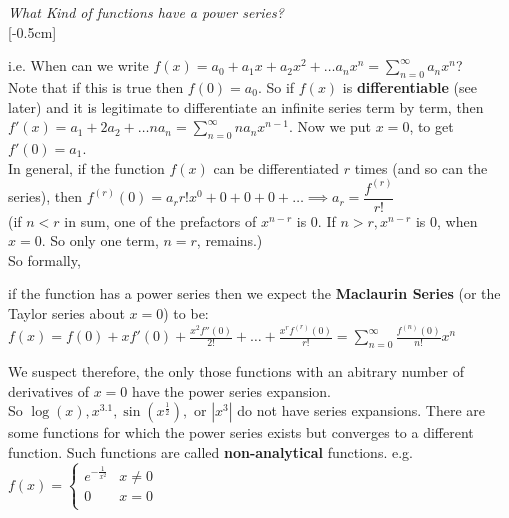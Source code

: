 
\textit{What Kind of functions have a power series?}\\
[-0.5cm]

i.e. When can we write $\displaystyle{f(x) = a_0 + a_1x + a_2x^2 + \dots a_nx^n = \sum_{n=0}^{\infty} a_nx^n}$?\\

Note that if this is true then $f(0) = a_0$. So if $f(x)$ is \textbf{differentiable} (see later)  and it is legitimate to differentiate an infinite series term by term, then $f'(x) = a_1 + 2a_2 + \dots na_n = \sum_{n=0}^{\infty} na_nx^{n-1}$. Now we put $x=0$, to get $f'(0) = a_1$. \\

In general, if the function $f(x)$ can be differentiated $r$ times (and so can the series), then $f^{(r)}(0) = a_r r!x^0 + 0 + 0 + 0 + \dots \implies \boxed{a_r = \dfrac{f^{(r)}}{r!}}$\\

(if $n<r$ in sum, one of the prefactors of $x^{n-r}$ is 0. If $n>r, x^{n-r}$ is 0, when $x=0$. So only one term, $n=r$, remains.)\\

So formally, \begin{Definition} \begin{shaded} if the function has a power series then we expect the \textbf{Maclaurin Series} (or the Taylor series about $x=0$) to be:\\

$\displaystyle{f(x) = f(0) + xf'(0) + \frac{x^2f''(0)}{2!} + \dots + \frac{x^rf^{(r)}(0)}{r!} = \sum_{n=0}^{\infty} \frac{f^{(n)}(0)}{n!} x^n}$\\
\end{shaded}
\end{Definition}

We suspect therefore, the only those functions with an abitrary number of derivatives of $x=0$ have the power series expansion.\\

So $\log(x), x^{3.1}, \sin(x^{\frac{1}{2}}),$ or $|x^3|$ do not have series expansions. There are some functions for which the power series exists but converges to a different function. Such functions are called \textbf{non-analytical} functions. e.g.\\

$f(x) = \begin{cases}
 e^{-\frac{1}{x^2}} & x \neq 0\\
0 & x=0\\
 \end{cases}$\\
 
